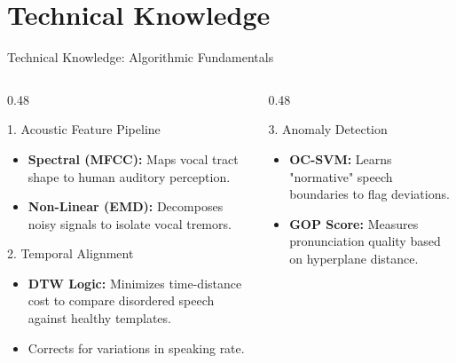 \documentclass[aspectratio=169, 11pt]{beamer}
\begin{document}
\section{Technical Knowledge}
\begin{frame}{Technical Knowledge: Algorithmic Fundamentals}
    \small
    \begin{columns}[t]
        \begin{column}{0.48\textwidth}
            
            \begin{block}{1. Acoustic Feature Pipeline}
                \begin{itemize}
                    \item \textbf{Spectral (MFCC):} Maps vocal tract shape to human auditory perception.
                    \item \textbf{Non-Linear (EMD):} Decomposes noisy signals to isolate vocal tremors.
                \end{itemize}
            \end{block}

            \vspace{0.5em}

            \begin{block}{2. Temporal Alignment}
                \begin{itemize}
                    \item \textbf{DTW Logic:} Minimizes time-distance cost to compare disordered speech against healthy templates.
                    \item Corrects for variations in speaking rate.
                \end{itemize}
            \end{block}
        \end{column}

        \begin{column}{0.48\textwidth}
            
            \begin{block}{3. Anomaly Detection}
                \begin{itemize}
                    \item \textbf{OC-SVM:} Learns "normative" speech boundaries to flag deviations.
                    \item \textbf{GOP Score:} Measures pronunciation quality based on hyperplane distance.
                \end{itemize}
            \end{block}


\end{column}
\end{columns}
\end{frame}
\end{document}
